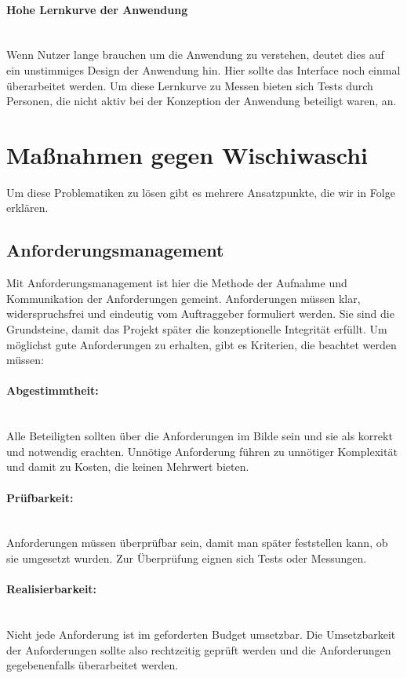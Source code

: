 \documentclass[a4paper, ngerman, 12pt, usenames, dvipsnames]{article}
\begin{document}
\paragraph{Hohe Lernkurve der Anwendung}\mbox{} \\
Wenn Nutzer lange brauchen um die Anwendung zu verstehen, deutet dies auf ein unstimmiges Design der Anwendung hin. Hier sollte das Interface noch einmal überarbeitet werden. Um diese Lernkurve zu Messen bieten sich Tests durch Personen, die nicht aktiv bei der Konzeption der Anwendung beteiligt waren, an. 

\section{Maßnahmen gegen Wischiwaschi}
Um diese Problematiken zu lösen gibt es mehrere Ansatzpunkte, die wir in Folge erklären.
\subsection{Anforderungsmanagement}
Mit Anforderungsmanagement ist hier die Methode der Aufnahme und Kommunikation der Anforderungen gemeint.
Anforderungen müssen klar, widerspruchsfrei und eindeutig vom Auftraggeber formuliert werden. Sie sind die Grundsteine, damit das Projekt später die konzeptionelle Integrität erfüllt. Um möglichst gute Anforderungen zu erhalten, gibt es Kriterien, die beachtet werden müssen:

\paragraph{Abgestimmtheit:}\mbox{} \\
Alle Beteiligten sollten über die Anforderungen im Bilde sein und sie als korrekt und notwendig erachten. Unnötige Anforderung führen zu unnötiger Komplexität und damit zu Kosten, die keinen Mehrwert bieten.

\paragraph{Prüfbarkeit:}\mbox{} \\
Anforderungen müssen überprüfbar sein, damit man später feststellen kann, ob sie umgesetzt wurden. 
Zur Überprüfung eignen sich Tests oder Messungen.
\paragraph{Realisierbarkeit:}\mbox{} \\
Nicht jede Anforderung ist im geforderten Budget umsetzbar. Die Umsetzbarkeit der Anforderungen sollte also rechtzeitig geprüft werden und die Anforderungen gegebenenfalls überarbeitet werden.
\end{document}
